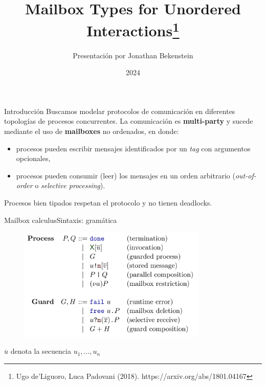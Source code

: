 \documentclass{beamer}
\title{Mailbox Types for Unordered Interactions\footnote{\tiny{Ugo de'Liguoro, Luca Padovani (2018). https://arxiv.org/abs/1801.04167}}}
\author{Presentación por Jonathan Bekenstein}
\institute{Materia optativa sobre Tipos Comportamentales y Contratos}
\date{2024}
\begin{document}
\frame{\titlepage}

\begin{frame}{Introducción}
    Buscamos modelar protocolos de comunicación en diferentes topologías de procesos concurrentes. La comunicación es \textbf{multi-party} y sucede mediante el uso de \textbf{mailboxes} no ordenados, en donde:
    \begin{itemize}
        \item procesos pueden escribir mensajes identificados por un \emph{tag} con argumentos opcionales,
        \item procesos pueden consumir (leer) los mensajes en un orden arbitrario (\emph{out-of-order} o \emph{selective processing}).
    \end{itemize}

    \center
    \vspace{-1em}
    \vspace{-1em}

    Procesos bien tipados respetan el protocolo y no tienen deadlocks.
\end{frame}

\begin{frame}{Mailbox calculus}{Sintaxis: gramática}
    \begin{figure}[H]
        \centering
        \includegraphics[width=0.8\textwidth]{syntax}
    \end{figure}

    \footnotesize{$\overline{u}$ denota la secuencia $u_1, \dots, u_n$}
\end{frame}
\end{document}
